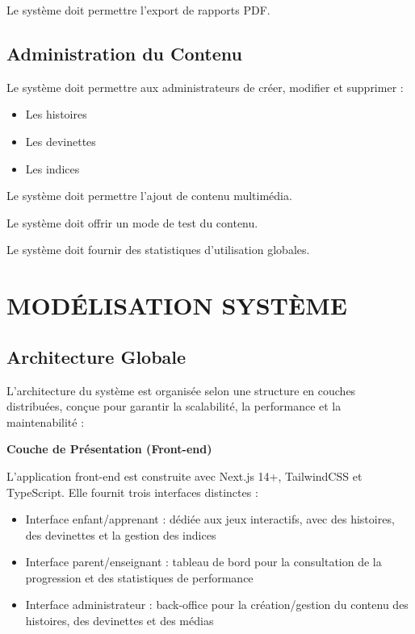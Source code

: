 \documentclass[12pt,a4paper]{article}
\begin{document}
Le système doit permettre l'export de rapports PDF.

\subsection{Administration du Contenu}

Le système doit permettre aux administrateurs de créer, modifier et supprimer :
\begin{itemize}
    \item Les histoires
    \item Les devinettes
    \item Les indices
\end{itemize}

Le système doit permettre l'ajout de contenu multimédia.

Le système doit offrir un mode de test du contenu.

Le système doit fournir des statistiques d'utilisation globales.

\newpage

\section{MODÉLISATION SYSTÈME}

\subsection{Architecture Globale}

L'architecture du système est organisée selon une structure en couches distribuées, conçue pour garantir la scalabilité, la performance et la maintenabilité :

\textbf{Couche de Présentation (Front-end)}

L'application front-end est construite avec Next.js 14+, TailwindCSS et TypeScript. Elle fournit trois interfaces distinctes :
\begin{itemize}
    \item Interface enfant/apprenant : dédiée aux jeux interactifs, avec des histoires, des devinettes et la gestion des indices
    \item Interface parent/enseignant : tableau de bord pour la consultation de la progression et des statistiques de performance
    \item Interface administrateur : back-office pour la création/gestion du contenu des histoires, des devinettes et des médias
\end{itemize}
\end{document}
